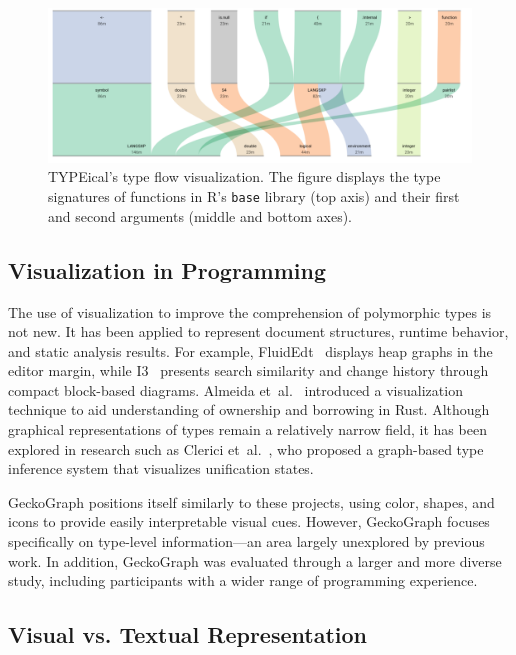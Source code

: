 \documentclass[preprint,12pt]{elsarticle}
\begin{document}
\begin{figure}
  \includegraphics[width=\linewidth]{figures/Typical.png}
  \caption{
        \label{fig:typical}
        TYPEical’s type flow visualization. 
        The figure displays the type signatures of functions in R’s \texttt{base} library (top axis) and their first and second arguments (middle and bottom axes).
  }
\end{figure}

\subsection{Visualization in Programming}
\label{sec:viz-programming}

The use of visualization to improve the comprehension of polymorphic types is not new. 
It has been applied to represent document structures, runtime behavior, and static analysis results. 
For example, FluidEdt~\cite{Ou2015-vr} displays heap graphs in the editor margin, while I3~\cite{Beck2015-my} presents search similarity and change history through compact block-based diagrams. 
Almeida et~al.~\cite{Almeida2022-bv} introduced a visualization technique to aid understanding of ownership and borrowing in Rust. 
Although graphical representations of types remain a relatively narrow field, it has been explored in research such as Clerici et~al.~\cite{Clerici2013-ru}, who proposed a graph-based type inference system that visualizes unification states.

GeckoGraph positions itself similarly to these projects, using color, shapes, and icons to provide easily interpretable visual cues. 
However, GeckoGraph focuses specifically on type-level information—an area largely unexplored by previous work. 
In addition, GeckoGraph was evaluated through a larger and more diverse study, including participants with a wider range of programming experience.

\subsection{Visual vs. Textual Representation}
\label{sec:visual-vs-textual}
\end{document}

